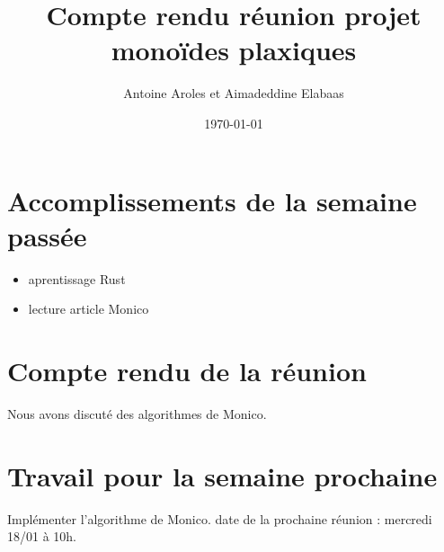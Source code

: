 \documentclass[a4paper,12pt]{article}
\title{Compte rendu réunion projet monoïdes plaxiques}  %
\author{Antoine Aroles et Aimadeddine Elabaas}
\date{\today}  %
\begin{document}
\maketitle
\section{Accomplissements de la semaine passée}
\begin{itemize}
\item aprentissage Rust
\item lecture article Monico
\end{itemize}
\section{Compte rendu de la réunion}
Nous avons discuté des algorithmes de Monico.
\section{Travail pour la semaine prochaine}
Implémenter l'algorithme de Monico.
\noindent
date de la prochaine réunion : mercredi 18/01 à 10h.
\end{document}

